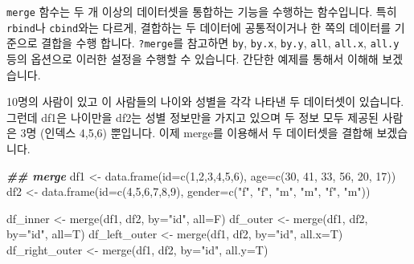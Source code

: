 \documentclass[
]{book}
\newenvironment{Shaded}{\begin{snugshade}}{\end{snugshade}}
\newcommand{\AttributeTok}[1]{\textcolor[rgb]{0.77,0.63,0.00}{#1}}
\newcommand{\DecValTok}[1]{\textcolor[rgb]{0.00,0.00,0.81}{#1}}
\newcommand{\DocumentationTok}[1]{\textcolor[rgb]{0.56,0.35,0.01}{\textbf{\textit{#1}}}}
\newcommand{\FunctionTok}[1]{\textcolor[rgb]{0.00,0.00,0.00}{#1}}
\newcommand{\NormalTok}[1]{#1}
\newcommand{\OtherTok}[1]{\textcolor[rgb]{0.56,0.35,0.01}{#1}}
\newcommand{\StringTok}[1]{\textcolor[rgb]{0.31,0.60,0.02}{#1}}
\begin{document}
\texttt{merge} 함수는 두 개 이상의 데이터셋을 통합하는 기능을 수행하는 함수입니다. 특히 \texttt{rbind}나 \texttt{cbind}와는 다르게, 결합하는 두 데이터에 공통적이거나 한 쪽의 데이터를 기준으로 결합을 수행 합니다. \texttt{?merge}를 참고하면 \texttt{by}, \texttt{by.x}, \texttt{by.y}, \texttt{all}, \texttt{all.x}, \texttt{all.y} 등의 옵션으로 이러한 설정을 수행할 수 있습니다. 간단한 예제를 통해서 이해해 보겠습니다.

10명의 사람이 있고 이 사람들의 나이와 성별을 각각 나타낸 두 데이터셋이 있습니다. 그런데 df1은 나이만을 df2는 성별 정보만을 가지고 있으며 두 정보 모두 제공된 사람은 3명 (인덱스 4,5,6) 뿐입니다. 이제 merge를 이용해서 두 데이터셋을 결합해 보겠습니다.

\begin{Shaded}
\begin{Highlighting}[]
\DocumentationTok{\#\# merge}
\NormalTok{df1 }\OtherTok{\textless{}{-}} \FunctionTok{data.frame}\NormalTok{(}\AttributeTok{id=}\FunctionTok{c}\NormalTok{(}\DecValTok{1}\NormalTok{,}\DecValTok{2}\NormalTok{,}\DecValTok{3}\NormalTok{,}\DecValTok{4}\NormalTok{,}\DecValTok{5}\NormalTok{,}\DecValTok{6}\NormalTok{), }\AttributeTok{age=}\FunctionTok{c}\NormalTok{(}\DecValTok{30}\NormalTok{, }\DecValTok{41}\NormalTok{, }\DecValTok{33}\NormalTok{, }\DecValTok{56}\NormalTok{, }\DecValTok{20}\NormalTok{, }\DecValTok{17}\NormalTok{))}
\NormalTok{df2 }\OtherTok{\textless{}{-}} \FunctionTok{data.frame}\NormalTok{(}\AttributeTok{id=}\FunctionTok{c}\NormalTok{(}\DecValTok{4}\NormalTok{,}\DecValTok{5}\NormalTok{,}\DecValTok{6}\NormalTok{,}\DecValTok{7}\NormalTok{,}\DecValTok{8}\NormalTok{,}\DecValTok{9}\NormalTok{), }\AttributeTok{gender=}\FunctionTok{c}\NormalTok{(}\StringTok{"f"}\NormalTok{, }\StringTok{"f"}\NormalTok{, }\StringTok{"m"}\NormalTok{, }\StringTok{"m"}\NormalTok{, }\StringTok{"f"}\NormalTok{, }\StringTok{"m"}\NormalTok{))}

\NormalTok{df\_inner }\OtherTok{\textless{}{-}} \FunctionTok{merge}\NormalTok{(df1, df2, }\AttributeTok{by=}\StringTok{"id"}\NormalTok{, }\AttributeTok{all=}\NormalTok{F)}
\NormalTok{df\_outer }\OtherTok{\textless{}{-}} \FunctionTok{merge}\NormalTok{(df1, df2, }\AttributeTok{by=}\StringTok{"id"}\NormalTok{, }\AttributeTok{all=}\NormalTok{T)}
\NormalTok{df\_left\_outer }\OtherTok{\textless{}{-}} \FunctionTok{merge}\NormalTok{(df1, df2, }\AttributeTok{by=}\StringTok{"id"}\NormalTok{, }\AttributeTok{all.x=}\NormalTok{T)}
\NormalTok{df\_right\_outer }\OtherTok{\textless{}{-}} \FunctionTok{merge}\NormalTok{(df1, df2, }\AttributeTok{by=}\StringTok{"id"}\NormalTok{, }\AttributeTok{all.y=}\NormalTok{T)}
\end{Highlighting}
\end{Shaded}
\end{document}
